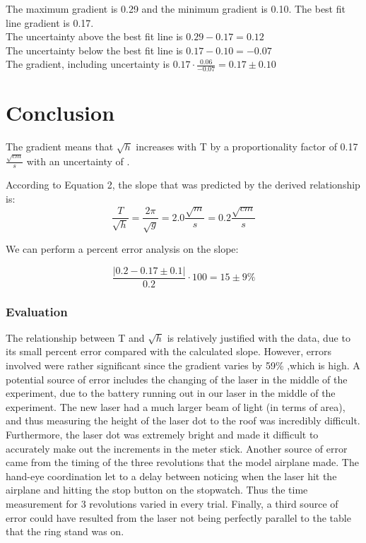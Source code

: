 \documentclass[10pt, letterpaper]{article}
\begin{document}
The maximum gradient is 0.29 and the minimum gradient is 0.10. The best fit line gradient is 0.17. \\
The uncertainty above the best fit line is $0.29 - 0.17 = 0.12$ \\
The uncertainty below the best fit line is $0.17 - 0.10 = -0.07$ \\
The gradient, including uncertainty is $0.17 \cdot \frac{0.06}{-0.07} = \boxed{0.17 \pm 0.10}$

\section{Conclusion}
The gradient means that $\sqrt{h}$ increases with T by a proportionality factor of 0.17 $\frac{\sqrt{cm}}{s}$
with an uncertainty of .

According to Equation 2, the slope that was predicted by the derived relationship is:
\[ \frac{T}{\sqrt{h}} = \frac{2\pi }{\sqrt{g}} = 2.0 \frac{\sqrt{m}}{s} = 0.2 \frac{\sqrt{cm}}{s} \]

We can perform a percent error analysis on the slope:

\[ \frac{|0.2 - 0.17 \pm 0.1|}{0.2} \cdot 100 = 15 \pm 9 \% \]

\subsubsection{Evaluation}
The relationship between T and $\sqrt{h}$ is relatively justified with the data, due to its small percent error compared with the calculated slope.
However, errors involved were rather significant since the gradient varies by 59\% ,which is high. A potential source of error includes the changing of
the laser in the middle of the experiment, due to the battery running out in our laser in the middle of the experiment. The new laser had a much larger
beam of light (in terms of area), and thus measuring the height of the laser dot to the roof was incredibly difficult. Furthermore, the laser dot was
extremely bright and made it difficult to accurately make out the increments in the meter stick. Another source of error came from the timing of the
three revolutions that the model airplane made. The hand-eye coordination let to a delay between noticing when the laser hit the airplane and hitting
the stop button on the stopwatch. Thus the time measurement for 3 revolutions varied in every trial. Finally, a third source of error could have resulted
from the laser not being perfectly parallel to the table that the ring stand was on.
\end{document}
